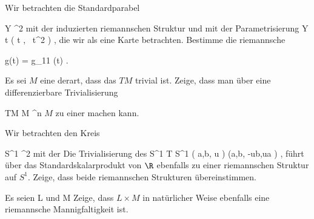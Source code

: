\setcounter{section}{16}


{}
{

Wir betrachten die Standardparabel

\mavergleichskette
{\vergleichskette
{ Y
}
{ \subseteq }{ \R^2
}
{  }{
}
{    }{
}
{   }{
}
}
{}{}{}
mit der induzierten riemannschen Struktur und mit der Parametrisierung
\maabbeledisp {\varphi} {\R} { Y
} { t } { \left(  t   , \,  t^2                   \right)
} {,}
die wir als eine
 {} {}
Karte betrachten. Bestimme die riemannsche

\mavergleichskette
{\vergleichskette
{ g(t)
}
{ = }{ g_{11} (t)
}
{  }{
}
{    }{
}
{   }{
}
}
{}{}{.}

}
{} {}

{}
{

Es sei $M$ eine
derart, dass das
$TM$ trivial ist. Zeige, dass man über eine differenzierbare Trivialisierung

\mavergleichskette
{\vergleichskette
{ TM
}
{ \cong }{ M \times \R^n
}
{  }{
}
{    }{
}
{   }{
}
}
{}{}{}
 {} {}
$M$ zu einer
machen kann.

}
{} {}

{}
{

Wir betrachten den Kreis

\mavergleichskette
{\vergleichskette
{ S^1
}
{ \subseteq }{ \R^2
}
{  }{
}
{    }{
}
{   }{
}
}
{}{}{}
mit der
Die Trivialisierung des
\maabbeledisp {} { S^1 \times \R } { T S^1
} {( a,b, u )} { (a,b, -ub,ua )
} {,}
führt über das Standardskalarprodukt von $\R$  ebenfalls zu einer riemannschen Struktur auf $S^1$. Zeige, dass beide riemannschen Strukturen übereinstimmen.

}
{} {}

{}
{

Es seien
\mathkor {} {L} {und} {M} {}
Zeige, dass $L \times M$ in natürlicher Weise ebenfalls eine riemannsche Mannigfaltigkeit ist.

}
{} {}

